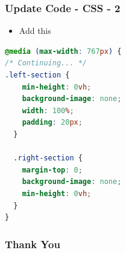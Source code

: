\documentclass[aspectratio=169, table]{beamer}
\begin{document}
\begin{frame}[fragile]
    \frametitle{Update Code - CSS - 2}
    \vskip1cm
	\begin{itemize}
        \item Add this
   	 \end{itemize}

\begin{lstlisting}[language=CSS]
@media (max-width: 767px) {
/* Continuing... */
.left-section {
    min-height: 0vh;
    background-image: none;
    width: 100%;
    padding: 20px;
  }

  .right-section {
    margin-top: 0;
    background-image: none;
    min-height: 0vh;
  }
}

    \end{lstlisting}
\end{frame}



\begin{frame4}
    \frametitle{Thank You}
\end{frame4}
\end{document}
